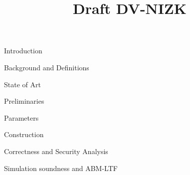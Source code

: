 


\pagestyle{plain}

\title{Draft DV-NIZK}

\maketitle

\begin{section}{Introduction}
  
\end{section}

\begin{section}{Background and Definitions}
  
\end{section}

\begin{section}{State of Art}
  
\end{section}

\begin{section}{Preliminaries}
  
\end{section}

\begin{section}{Parameters}
  
\end{section}

\begin{section}{Construction}
  
\end{section}


\begin{section}{Correctness and Security Analysis}
  
\end{section}


\begin{section}{Simulation soundness and ABM-LTF}
  
\end{section}




\begin{appendix}
  
\end{appendix}







